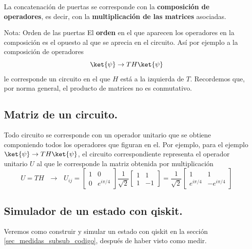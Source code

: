 \documentclass[a4paper,11pt]{book} %
\numberwithin{equation}{chapter}
\begin{document}
 La concatenación de puertas se corresponde con la \textbf{composición de operadores}, es decir, con la \textbf{multiplicación de las matrices} asociadas. 

	\begin{mybox_blue}{Nota: Orden de las puertas}
	El \textbf{orden} en el que aparecen los operadores en la composición es el opuesto al que se 
	aprecia en el circuito. Así por ejemplo a la composición de operadores 
	$$
	\ket{\psi} \to  TH \ket{\psi} 
	$$
	le corresponde un circuito en el que  $H$ está a la izquierda de $T$. Recordemos que, por norma general,
	el producto de matrices no es conmutativo.
	\end{mybox_blue} 
 
 


		\subsection{Matriz de un circuito.}
		
Todo circuito se corresponde con un operador unitario que se obtiene componiendo todos los operadores que figuran en el. Por ejemplo, para el ejemplo $	\ket{\psi} \to  TH \ket{\psi}$, el circuito correspondiente representa el operador unitario $U$ al que le corresponde la matriz obtenida por multiplicación
	$$
	U = T H ~~~\to ~~~ U_{ij} = 
	\begin{bmatrix}1&0\\0&e^{i\pi/4}\end{bmatrix} \frac{1}{\sqrt{2}} 
	\begin{bmatrix} 1& 1 \\ 1 & -1 \end{bmatrix}  = 
	\frac{1}{\sqrt{2}} \begin{bmatrix} 1& 1 \\ e^{i\pi/4} & -e^{i\pi/4} \end{bmatrix} 
	$$

		\subsection{Simulador de un estado con qiskit.}
		
Veremos como construir y simular un estado con qiskit en la sección \ref{sec_medidas_subsub_codigo}, después de haber visto como medir.
\end{document}
